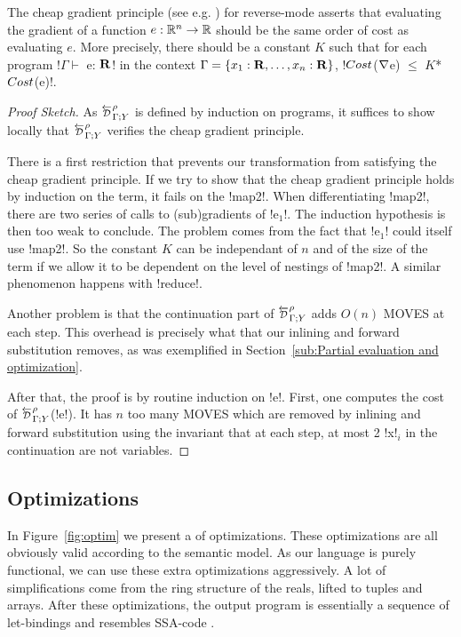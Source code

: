 The cheap gradient principle (see e.g. \cite{griewank2008evaluating}) for reverse-mode
asserts that evaluating the gradient of a function $e:\mathbb{R}^n\to\mathbb{R}$ 
should be the same order of cost as evaluating $e$. 
More precisely, there should be a constant $K$ such that for each program !$\Gamma \vdash$ e: $\mathbf{R}$! in the context $\Gamma=\{x_1:\mathbf{R},\ldots,x_n:\mathbf{R}\}$,
!$Cost$($\nabla$e) $\leq$ $K$*$Cost$(e)!.

\begin{proof}[Proof Sketch]
    As $\directD{\rho}{\Gamma}{Y}$ is defined by induction on programs, it suffices to show locally 
that $\directD{\rho}{\Gamma}{Y}$ verifies the cheap gradient principle. 

There is a first restriction that prevents our transformation from satisfying the cheap gradient principle.
If we try to show that the cheap gradient principle holds by induction on the term, it fails on the !map2!.
When differentiating !map2!, there are two series of calls to (sub)gradients of !e$_1$!. 
The induction hypothesis is then too weak to conclude. 
The problem comes from the fact that !e$_1$! could itself use !map2!. 
So the constant $K$ can be independant of $n$ and of 
the size of the term if we allow it to be dependent on the level of nestings of !map2!.
A similar phenomenon happens with !reduce!.

Another problem is that the continuation part of $\directD{\rho}{\Gamma}{Y}$ adds $O(n)$ MOVES at each step.
This overhead is precisely what that our inlining and forward substitution removes, 
as was exemplified in Section~\ref{sub:Partial evaluation and optimization}. 

After that, the proof is by routine induction on !e!. 
First, one computes the cost of $\directD{\rho}{\Gamma}{Y}$(!e!).
It has $n$ too many MOVES which are removed by inlining and forward substitution using the invariant that at each step, 
at most 2 !x!$_i$ in the continuation are not variables.
\end{proof}



\subsection{Optimizations} %
\label{sub:Optimizations}

In Figure~\ref{fig:optim} we present a of optimizations. 
These optimizations are all obviously valid according to the semantic model. 
As our language is purely functional, we can use these extra optimizations aggressively. 
A lot of simplifications come from the ring structure of the reals, lifted to tuples and arrays.
After these optimizations, the output program is essentially a sequence of let-bindings 
and resembles SSA-code \cite{cytron1989efficient}.

